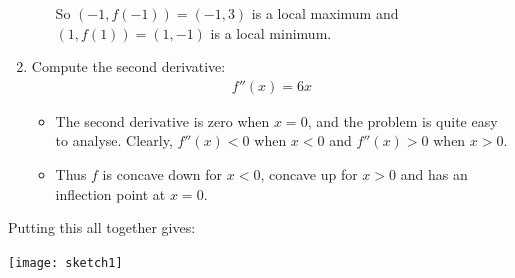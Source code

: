 \begin{eg}[Sketch $f(x)=x^3-3x+1$]
\begin{enumerate}[(1)]
\begin{itemize}
So $(-1,f(-1))=(-1,3)$ is a local maximum and $(1,f(1))=(1,-1)$ is a local
minimum.

\end{itemize}

\item Compute the second derivative:
\begin{align*}
f''(x) = 6x
\end{align*}
\begin{itemize}
 \item The second derivative is zero when $x=0$, and the problem is quite easy to
analyse. Clearly, $f''(x)<0$ when $x<0$ and $f''(x)>0$ when $x>0$.
\item Thus $f$ is concave down for $x<0$, concave up for $x>0$ and has an inflection
point at $x=0$.
\end{itemize}
\end{enumerate}
Putting this all together gives:
\begin{efig}
\begin{center}
   \texttt{[image: sketch1]}
\end{center}
\end{efig}
\end{eg}
\goodbreak

